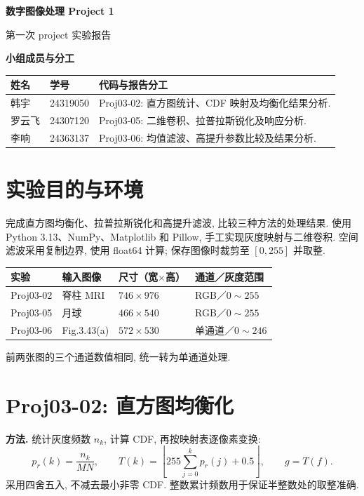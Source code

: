 \documentclass[UTF8,a4paper,zihao=5,fontset=fandol]{ctexart}
\begin{document}
\begin{center}
{\LARGE\bfseries 数字图像处理 Project 1}\par\vspace{5pt}
{\normalsize 第一次 project 实验报告}
\end{center}
\vspace{-4pt}

\noindent\textbf{小组成员与分工}
\begin{center}\small
\begin{tabular}{llp{100mm}}
\toprule
姓名 & 学号 & 代码与报告分工\\
\midrule
韩宇 & 24319050 & Proj03-02: 直方图统计、CDF 映射及均衡化结果分析.\\
罗云飞 & 24307120 & Proj03-05: 二维卷积、拉普拉斯锐化及响应分析.\\
李响 & 24363137 & Proj03-06: 均值滤波、高提升参数比较及结果分析.\\
\bottomrule
\end{tabular}
\end{center}
\vspace{-4pt}

\section{实验目的与环境}
完成直方图均衡化、拉普拉斯锐化和高提升滤波, 比较三种方法的处理结果.
使用 Python 3.13、NumPy、Matplotlib 和 Pillow, 手工实现灰度映射与二维卷积.
空间滤波采用复制边界, 使用 float64 计算; 保存图像时裁剪至 $[0,255]$ 并取整.

\begin{center}\small
\begin{tabular}{llll}
\toprule
实验 & 输入图像 & 尺寸（宽$\times$高） & 通道／灰度范围\\
\midrule
Proj03-02 & 脊柱 MRI & $746\times976$ & RGB／$0\!\sim\!255$\\
Proj03-05 & 月球 & $466\times540$ & RGB／$0\!\sim\!255$\\
Proj03-06 & Fig.3.43(a) & $572\times530$ & 单通道／$0\!\sim\!246$\\
\bottomrule
\end{tabular}
\end{center}
\vspace{-5pt}
前两张图的三个通道数值相同, 统一转为单通道处理.

\section{Proj03-02: 直方图均衡化}
\textbf{方法.} 统计灰度频数 $n_k$, 计算 CDF, 再按映射表逐像素变换:
\[
p_r(k)=\frac{n_k}{MN},\qquad
T(k)=\left\lfloor255\sum_{j=0}^{k}p_r(j)+0.5\right\rfloor,\qquad g=T(f).
\]
采用四舍五入, 不减去最小非零 CDF. 整数累计频数用于保证半整数处的取整准确.
\end{document}
